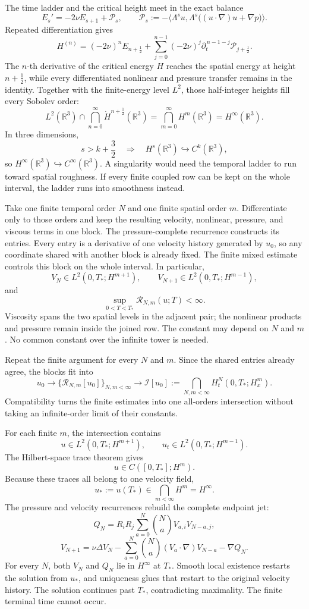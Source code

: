 \documentclass[11pt]{article}
\begin{document}
The time ladder and the critical height meet in the exact balance
\[
E_s'=-2\nu E_{s+1}+\mathcal P_s,
\qquad
\mathcal P_s
:=-\bigl\langle\Lambda^su,
\Lambda^s\bigl((u\cdot\nabla)u+\nabla p\bigr)\bigr\rangle.
\]
Repeated differentiation gives
\[
H^{(n)}
=(-2\nu)^nE_{n+\frac12}
+\sum_{j=0}^{n-1}(-2\nu)^j
\partial_t^{\,n-1-j}\mathcal P_{j+\frac12}.
\]
The \(n\)-th derivative of the critical energy \(H\) reaches the spatial energy at height \(n+\tfrac12\), while every differentiated nonlinear and pressure transfer remains in the identity. Together with the finite-energy level \(L^2\), those half-integer heights fill every Sobolev order:
\[
L^2(\mathbb R^3)
\cap\bigcap_{n=0}^{\infty}\dot H^{n+\frac12}(\mathbb R^3)
=\bigcap_{m=0}^{\infty}H^m(\mathbb R^3)
=H^\infty(\mathbb R^3).
\]
In three dimensions,
\[
s>k+\frac32
\quad\Longrightarrow\quad
H^s(\mathbb R^3)\hookrightarrow C^k(\mathbb R^3),
\]
so \(H^\infty(\mathbb R^3)\hookrightarrow C^\infty(\mathbb R^3)\). A singularity would need the temporal ladder to run toward spatial roughness. If every finite coupled row can be kept on the whole interval, the ladder runs into smoothness instead.

Take one finite temporal order \(N\) and one finite spatial order \(m\). Differentiate only to those orders and keep the resulting velocity, nonlinear, pressure, and viscous terms in one block. The pressure-complete recurrence constructs its entries. Every entry is a derivative of one velocity history generated by \(u_0\), so any coordinate shared with another block is already fixed. The finite mixed estimate controls this block on the whole interval. In particular,
\[
V_N\in L^2(0,T_*;H^{m+1}),
\qquad
V_{N+1}\in L^2(0,T_*;H^{m-1}),
\]
and
\[
\sup_{0<T<T_*}\mathcal R_{N,m}(u;T)<\infty.
\]
Viscosity spans the two spatial levels in the adjacent pair; the nonlinear products and pressure remain inside the joined row. The constant may depend on \(N\) and \(m\). No common constant over the infinite tower is needed.

Repeat the finite argument for every \(N\) and \(m\). Since the shared entries already agree, the blocks fit into
\[
u_0
\longrightarrow
\{\mathcal R_{N,m}[u_0]\}_{N,m<\infty}
\longrightarrow
\mathcal I[u_0]
:=
\bigcap_{N,m<\infty}H_t^N(0,T_*;H_x^m).
\]
Compatibility turns the finite estimates into one all-orders intersection without taking an infinite-order limit of their constants.

For each finite \(m\), the intersection contains
\[
u\in L^2(0,T_*;H^{m+1}),
\qquad
u_t\in L^2(0,T_*;H^{m-1}).
\]
The Hilbert-space trace theorem gives
\[
u\in C([0,T_*];H^m).
\]
Because these traces all belong to one velocity field,
\[
u_*:=u(T_*)\in\bigcap_{m<\infty}H^m=H^\infty.
\]
The pressure and velocity recurrences rebuild the complete endpoint jet:
\[
Q_N
=R_iR_j\sum_{a=0}^{N}\binom NaV_{a,i}V_{N-a,j},
\]
\[
V_{N+1}
=\nu\Delta V_N
-\sum_{a=0}^{N}\binom Na(V_a\cdot\nabla)V_{N-a}
-\nabla Q_N.
\]
For every \(N\), both \(V_N\) and \(Q_N\) lie in \(H^\infty\) at \(T_*\). Smooth local existence restarts the solution from \(u_*\), and uniqueness glues that restart to the original velocity history. The solution continues past \(T_*\), contradicting maximality. The finite terminal time cannot occur.
\end{document}
